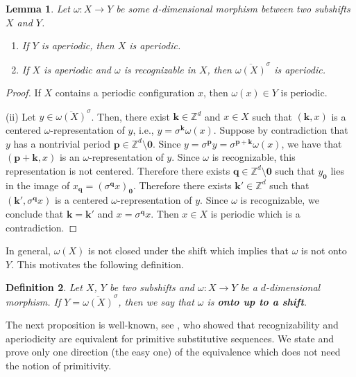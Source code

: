 \documentclass[12pt]{amsart}
\newtheorem{definition}{Definition}[section]
\newtheorem{lemma}[definition]{Lemma}
\newcommand{\Z}{\mathbb{Z}}
\newcommand{\zero}{{\boldsymbol{0}}}
\newcommand{\bk}{{\boldsymbol{k}}}
\newcommand{\bp}{{\boldsymbol{p}}}
\newcommand{\bq}{{\boldsymbol{q}}}
\newcommand{\Acal}{\mathcal{A}} %
\newcommand{\shiftclosure}[1]{{\overline{#1}^{\sigma}}}
\newcommand{\ifnv}[2]{\ifthenelse{\equal{#1}{}}{}{#2}}
\newcommand\defn[2][]{\ifnv{#1}{\index{#1|\textbf}}{\index{#2|\textbf}}\textbf{#2}}
\begin{document}

\begin{lemma}\label{lem:aperiodic-implies-aperiodic}
    Let $\omega:X\to Y$ be some $d$-dimensional morphism between two
    subshifts $X$ and $Y$.
\begin{enumerate}
\item 
   If $Y$ is aperiodic, then $X$ is aperiodic.
\item If $X$ is aperiodic and $\omega$ is recognizable in $X$,
    then $\shiftclosure{\omega(X)}$ is aperiodic.
\end{enumerate}
\end{lemma}

\begin{proof}
    If $X$ contains a periodic configuration $x$, then
    $\omega(x)\in Y$ is periodic.

    (ii)
    Let $y\in\shiftclosure{\omega(X)}$.
    Then, there exist $\bk\in\Z^d$ and $x\in X$ such that 
    $(\bk, x)$ is a centered $\omega$-representation of $y$, i.e.,
    $y=\sigma^\bk\omega(x)$.
    Suppose by contradiction that $y$ has a nontrivial period
    $\bp\in\Z^d\setminus\zero$.
    Since $y =\sigma^\bp y =\sigma^{\bp+\bk}\omega(x)$,
    we have that
    $(\bp+\bk, x)$ is an $\omega$-representation of $y$.
    Since $\omega$ is recognizable, this representation is not centered.
    Therefore there exists $\bq\in\Z^d\setminus\zero$ such that
    $y_\zero$ lies in the image of $x_\bq=(\sigma^\bq x)_\zero$.
    Therefore there exists $\bk'\in\Z^d$ such that
    $(\bk',\sigma^\bq x)$ is a centered $\omega$-representation of $y$.
    Since $\omega$ is recognizable, we conclude that
    $\bk=\bk'$ and $x=\sigma^\bq x$. Then $x\in X$ is periodic which is a
    contradiction.
\end{proof}

In general, $\omega(X)$ is not closed under the shift which implies that
$\omega$ is not onto $Y$. This motivates the following definition.

\begin{definition}
Let $X$, $Y$ be two subshifts
and $\omega:X\to Y$ be a $d$-dimensional morphism.
If $Y=\shiftclosure{\omega(X)}$, then
we say that $\omega$
is \defn{onto up to a shift}.
\end{definition}

The next proposition is well-known, see \cite{MR1637896,MR1168468}, who showed that
recognizability and aperiodicity are equivalent for primitive substitutive
sequences. We state and prove only one direction (the easy one) of the equivalence
which does not need the notion of primitivity.
\end{document}
